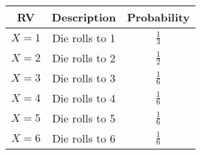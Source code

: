 
\begin{center}
\begin{tabular}{|c|c|c|}
\hline
\textbf{RV} & \textbf{Description} & \textbf{Probability}\\ \hline
$X = 1$	    &   Die rolls to 1  & $\frac{1}{3}$\\ \hline
$X = 2$	    &   Die rolls to 2  & $\frac{1}{2}$\\ \hline
$X = 3$	    &   Die rolls to 3  & $\frac{1}{6}$ \\ \hline
$X = 4$	    &   Die rolls to 4  & $\frac{1}{6}$ \\ \hline
$X = 5$	    &   Die rolls to 5  & $\frac{1}{6}$ \\ \hline
$X = 6$	    &   Die rolls to 6  & $\frac{1}{6}$ \\ \hline
\end{tabular}
\end{center}
